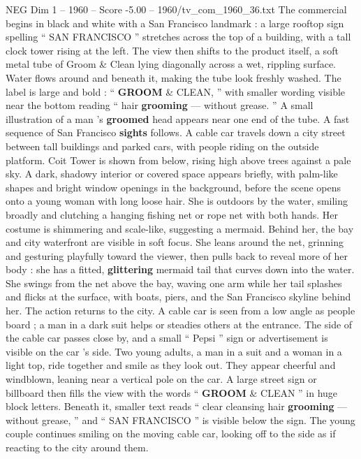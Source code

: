 \begin{textsample}{NEG Dim 1 – 1960 – Score -5.00 – 1960/tv\_com\_1960\_36.txt}  \label{ex:f1_neg_023}
The commercial begins in black and white with a San Francisco landmark : a large rooftop sign spelling “ SAN FRANCISCO ” stretches across the top of a building, with a tall clock tower rising at the left.
The view then shifts to the product itself, a soft metal tube of Groom \& Clean lying diagonally across a wet, rippling surface.
Water flows around and beneath it, making the tube look freshly washed.
The label is large and bold : “ \textbf{GROOM} \& CLEAN, ” with smaller wording visible near the bottom reading “ hair \textbf{grooming} — without grease. ” A small illustration of a man ’s \textbf{groomed} head appears near one end of the tube.
A fast sequence of San Francisco \textbf{sights} follows.
A cable car travels down a city street between tall buildings and parked cars, with people riding on the outside platform.
Coit Tower is shown from below, rising high above trees against a pale sky.
A dark, shadowy interior or covered space appears briefly, with palm-like shapes and bright window openings in the background, before the scene opens onto a young woman with long loose hair.
She is outdoors by the water, smiling broadly and clutching a hanging fishing net or rope net with both hands.
Her costume is shimmering and scale-like, suggesting a mermaid.
Behind her, the bay and city waterfront are visible in soft focus.
She leans around the net, grinning and gesturing playfully toward the viewer, then pulls back to reveal more of her body : she has a fitted, \textbf{glittering} mermaid tail that curves down into the water.
She swings from the net above the bay, waving one arm while her tail splashes and flicks at the surface, with boats, piers, and the San Francisco skyline behind her.
The action returns to the city.
A cable car is seen from a low angle as people board ; a man in a dark suit helps or steadies others at the entrance.
The side of the cable car passes close by, and a small “ Pepsi ” sign or advertisement is visible on the car ’s side.
Two young adults, a man in a suit and a woman in a light top, ride together and smile as they look out.
They appear cheerful and windblown, leaning near a vertical pole on the car.
A large street sign or billboard then fills the view with the words “ \textbf{GROOM} \& CLEAN ” in huge block letters.
Beneath it, smaller text reads “ clear cleansing hair \textbf{grooming} — without grease, ” and “ SAN FRANCISCO ” is visible below the sign.
The young couple continues smiling on the moving cable car, looking off to the side as if reacting to the city around them.

\end{textsample}

